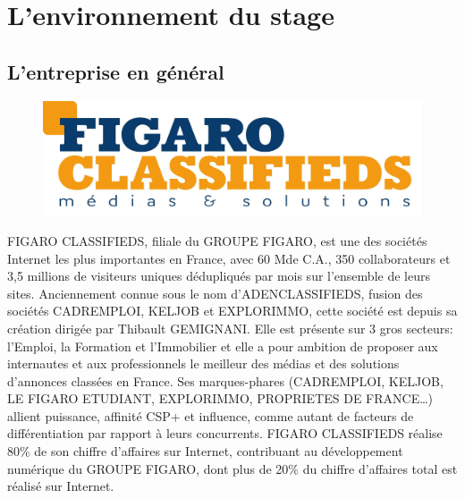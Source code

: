 
\chapter{L'environnement du stage} %

\label{environnement} %


\section{L'entreprise en général}
\begin{figure}[h]
  \centering
  \includegraphics[scale=0.15]{Pictures/logoFC.jpg}
\end{figure}
FIGARO CLASSIFIEDS, filiale du GROUPE FIGARO, est une des sociétés Internet les plus importantes en France, avec 60 M\texteuro de C.A., 350 collaborateurs et 3,5 millions de visiteurs uniques dédupliqués par mois sur l’ensemble de leurs sites.
Anciennement connue sous le nom d'ADENCLASSIFIEDS, fusion des sociétés CADREMPLOI, KELJOB et EXPLORIMMO, cette société est depuis sa création dirigée par Thibault GEMIGNANI.
Elle est présente sur 3 gros secteurs: l’Emploi, la Formation et l’Immobilier et elle a pour ambition de proposer aux internautes et aux professionnels le meilleur des médias et des solutions d'annonces classées en France.
Ses marques-phares (CADREMPLOI, KELJOB, LE FIGARO ETUDIANT, EXPLORIMMO, PROPRIETES DE FRANCE…) allient puissance, affinité CSP+ et influence, comme autant de facteurs de différentiation par rapport à leurs concurrents.
FIGARO CLASSIFIEDS réalise 80\% de son chiffre d’affaires sur Internet, contribuant au développement numérique du GROUPE FIGARO, dont plus de 20\% du chiffre d’affaires total est réalisé sur Internet.

